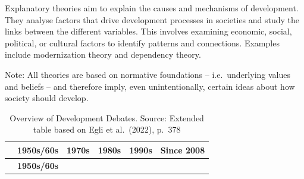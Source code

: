 \documentclass[
  a4paper,
  openany]{book}
\begin{document}
Explanatory theories aim to explain the causes and mechanisms of
development. They analyse factors that drive development processes in
societies and study the links between the different variables. This
involves examining economic, social, political, or cultural factors to
identify patterns and connections. Examples include modernization theory
and dependency theory.

Note: All theories are based on normative foundations -- i.e.~underlying
values and beliefs -- and therefore imply, even unintentionally, certain
ideas about how society should develop.

\begin{longtable}[]{@{}
  >{\raggedright\arraybackslash}p{}
  >{\raggedright\arraybackslash}p{}
  >{\raggedright\arraybackslash}p{}
  >{\raggedright\arraybackslash}p{}
  >{\raggedright\arraybackslash}p{}
  >{\raggedright\arraybackslash}p{}@{}}
\caption{Overview of Development Debates. Source: Extended table based
on Egli et al.~(2022),
p.~378}\label{tbl-development-debates}\tabularnewline
\toprule\noalign{}
\begin{minipage}[b]{\linewidth}\raggedright
\end{minipage} & \begin{minipage}[b]{\linewidth}\raggedright
\textbf{1950s/60s}
\end{minipage} & \begin{minipage}[b]{\linewidth}\raggedright
\textbf{1970s}
\end{minipage} & \begin{minipage}[b]{\linewidth}\raggedright
\textbf{1980s}
\end{minipage} & \begin{minipage}[b]{\linewidth}\raggedright
\textbf{1990s}
\end{minipage} & \begin{minipage}[b]{\linewidth}\raggedright
\textbf{Since 2008}
\end{minipage} \\
\midrule\noalign{}
\endfirsthead
\toprule\noalign{}
\begin{minipage}[b]{\linewidth}\raggedright
\end{minipage} & \begin{minipage}[b]{\linewidth}\raggedright
\textbf{1950s/60s}

\end{minipage}
\end{longtable}
\end{document}
